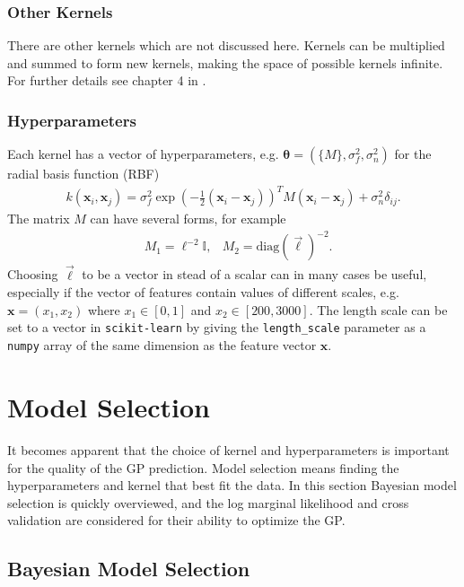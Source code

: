 \documentclass[twoside,english]{uiofysmaster}
\begin{document}
\subsubsection{Other Kernels}

There are other kernels which are not discussed here. Kernels can be multiplied and summed to form new kernels, making the space of possible kernels infinite. For further details see chapter 4 in \cite{rasmussen2006gaussian}.





\subsubsection{Hyperparameters}

Each kernel has a vector of hyperparameters, e.g. $\boldsymbol{\theta} = (\{M\}, \sigma^2_f, \sigma_n^2)$ for the radial basis function (RBF)
\begin{align}
k(\textbf{x}_i, \textbf{x}_j) = \sigma_f^2 \exp (- \frac{1}{2} (\textbf{x}_i - \textbf{x}_j))^T M (\textbf{x}_i - \textbf{x}_j) + \sigma_n^2 \delta_{ij}.
\end{align}
The matrix $M$ can have several forms, for example
\begin{align}
&M_1 = \ell^{-2} \mathbb{I} , &M_2 = \text{diag}(\vec{\ell})^{-2}.
\end{align}
Choosing $\vec{\ell}$ to be a vector in stead of a scalar can in many cases be useful, especially if the vector of features contain values of different scales, e.g. $\textbf{x} = (x_1, x_2)$ where $x_1 \in [0, 1]$ and $x_2 \in [200, 3000]$. The length scale can be set to a vector in \verb|scikit-learn| by giving the \verb|length_scale| parameter as a \verb|numpy| array of the same dimension as the feature vector $\textbf{x}$.



\section{Model Selection}

It becomes apparent that the choice of kernel and hyperparameters is important for the quality of the GP prediction. Model selection means finding the hyperparameters and kernel that best fit the data. In this section Bayesian model selection is quickly overviewed, and the log marginal likelihood and cross validation are considered for their ability to optimize the GP.

\subsection{Bayesian Model Selection}
\end{document}
